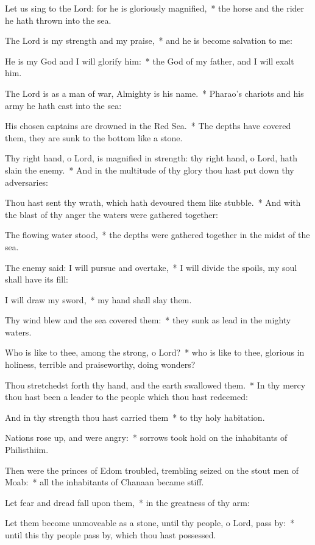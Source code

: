 \begin{enpars}
\item Let us sing to the Lord: for he is gloriously magnified,~* the horse and the rider he hath thrown into the sea.
\item The Lord is my strength and my praise,~* and he is become salvation to me:
\item He is my God and I will glorify him:~* the God of my father, and I will exalt him.
\item The Lord is as a man of war, Almighty is his name.~* Pharao’s chariots and his army he hath cast into the sea:
\item His chosen captains are drowned in the Red Sea.~* The depths have covered them, they are sunk to the bottom like a stone.
\item Thy right hand, o Lord, is magnified in strength: thy right hand, o Lord, hath slain the enemy.~* And in the multitude of thy glory thou hast put down thy adversaries:
\item Thou hast sent thy wrath, which hath devoured them like stubble.~* And with the blast of thy anger the waters were gathered together:
\item The flowing water stood,~* the depths were gathered together in the midst of the sea.
\item The enemy said: I will pursue and overtake,~* I will divide the spoils, my soul shall have its fill:
\item I will draw my sword,~* my hand shall slay them.
\item Thy wind blew and the sea covered them:~* they sunk as lead in the mighty waters.
\item Who is like to thee, among the strong, o Lord?~* who is like to thee, glorious in holiness, terrible and praiseworthy, doing wonders?
\item Thou stretchedst forth thy hand, and the earth swallowed them.~* In thy mercy thou hast been a leader to the people which thou hast redeemed:
\item And in thy strength thou hast carried them~* to thy holy habitation.
\item Nations rose up, and were angry:~* sorrows took hold on the inhabitants of Philisthiim.
\item Then were the princes of Edom troubled, trembling seized on the stout men of Moab:~* all the inhabitants of Chanaan became stiff.
\item Let fear and dread fall upon them,~* in the greatness of thy arm:
\item Let them become unmoveable as a stone, until thy people, o Lord, pass by:~* until this thy people pass by, which thou hast possessed.

\end{enpars}
